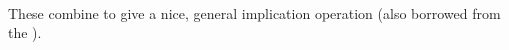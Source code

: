 \begin{code}
\AgdaSpace{}%
\AgdaSpace{}%
\AgdaSpace{}%
\AgdaSpace{}%
\AgdaSpace{}%
\AgdaSpace{}%
\AgdaSpace{}%
\AgdaSpace{}%
\AgdaSpace{}%
\AgdaSpace{}%
\AgdaSpace{}%
\AgdaSpace{}%
\AgdaSpace{}%
\AgdaSpace{}%
\AgdaSpace{}%
\AgdaSpace{}%
\AgdaSpace{}%
\<%
\\
%
\>[0]\AgdaSpace{}%
\AgdaSpace{}%
\AgdaSpace{}%
\AgdaSymbol{=}\AgdaSpace{}%
\AgdaSpace{}%
\AgdaSymbol{\{}\AgdaSpace{}%
\AgdaSymbol{\}}\AgdaSpace{}%
\AgdaSpace{}%
\AgdaSpace{}%
\AgdaSpace{}%
\AgdaSpace{}%
\AgdaSpace{}%
\AgdaSpace{}%
\AgdaSpace{}%
\<%
\end{code}
\ccpad
These combine to give a nice, general implication operation (also borrowed from the \agdastdlib).
\ccpad
